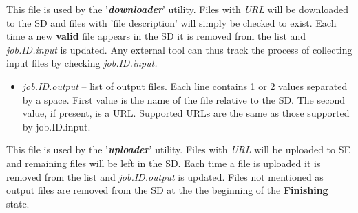 \documentclass{article}                            %
\begin{document}
This file is used by the '\textbf{\textit{downloader}}' utility. Files
with \emph{URL} will be downloaded to the SD and files with 'file
description' will simply be checked to exist. Each time a new \textbf{valid}
file appears in the SD it is removed from the list and \textit{job.ID.input}
is updated. Any external tool can thus track the process of collecting
input files by checking \textit{job.ID.input.}

\begin{itemize}
\item \textit{job.ID.output} -- list of output files. Each line contains
1 or 2 values separated by a space. First value is the name of the
file relative to the SD. The second value, if present, is a URL. Supported
URLs are the same as those supported by job.ID.input.
\end{itemize}

This file is used by the '\textbf{\textit{uploader}}' utility. Files
with \textit{URL} will be uploaded to SE and remaining files will
be left in the SD. Each time a file is uploaded it is removed from
the list and \textit{job.ID.output} is updated. Files not mentioned
as output files are removed from the SD at the the beginning of the
\textbf{Finishing} state.
\end{document}
